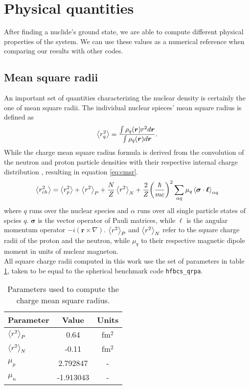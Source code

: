 \section{Physical quantities}
After finding a nuclide's ground state, we are able to compute different physical properties of the system. We can use these values as a numerical reference when comparing our results with other codes.
\subsection{Mean square radii}
An important set of quantities characterizing the nuclear density is certainly the one of mean square radii.
The individual nuclear spieces' mean square radius is defined as
\begin{equation}
    \label{eq:msr}
    \expval{r^2_q} = \frac{\int\rho_q(\bm r) r^2 d\bm r}{\int \rho_q(\bm r) d\bm r}.
\end{equation}
While the charge mean square radius formula is derived from the convolution of the neutron and proton particle densities with their respective internal charge distribution \cite{BERTOZZI1972408}, resulting in equation \eqref{eq:cmsr}.
\begin{equation}
    \label{eq:cmsr}
    \expval{r^2_{ch}} = \expval{r^2_p} + \expval{r^2}_P + \frac N Z \expval{r^2}_N + \frac 2 Z \bigg(\frac{ \hbar}{mc}\bigg)^2\sum_{\alpha q}\mu_q \expval{\bm \sigma\cdot \bm {\ell}}_{\alpha q}
\end{equation}
where $q$ runs over the nuclear species and $\alpha$ runs over all single particle states of spcies $q$. $\bm \sigma$ is the vector operator of Pauli matrices, while $\bm {\ell}$ is the angular momentum operator $-i(\bm r \times \nabla)$.
$\expval{r^2}_P$ and $\expval{r^2}_N$ refer to the square charge radii of the proton and the neutron, while $\mu_q$ to their respective magnetic dipole moment in units of nuclear magneton.
\\All square charge radii computed in this work use the set of parameters in table \ref{tab:charge_par}, taken to be equal to the spherical benchmark code \texttt{hfbcs\_qrpa}.
\begin{table}[ht]
  \centering
  \begin{tabular}{lcc}
    \toprule
    \textbf{Parameter} & \textbf{Value} & \textbf{Units} \\
    \midrule
    $\expval{r^2}_P$ & 0.64 & fm$^2$ \\
    $\expval{r^2}_N$ & -0.11 & fm$^2$ \\
    $\mu_p$ & 2.792847 & - \\
    $\mu_n$ & -1.913043 & - \\
    \bottomrule
  \end{tabular}
  \caption{Parameters used to compute the charge mean square radius.}
  \label{tab:charge_par}
\end{table}
